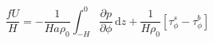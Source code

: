 
\begin{equation}
    \frac{fU}{H} = -\frac{1}{Ha\rho_0}\int_{-H}^0\frac{\partial p}{\partial\phi} \, \text{d}z + \frac{1}{H\rho_0}\left[\tau_\phi^s-\tau_\phi^b\right]
\label{EQN:VAvV}
\end{equation}
